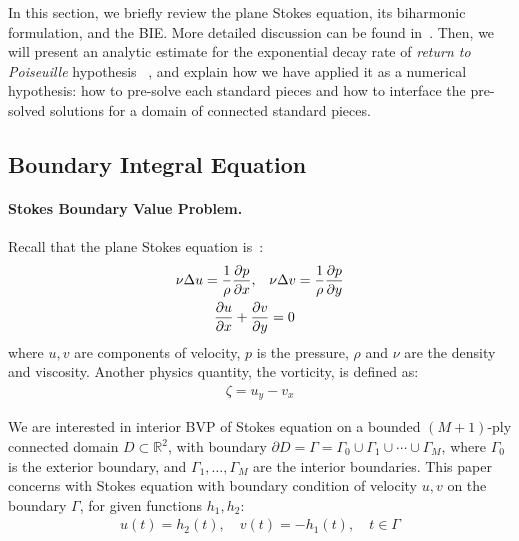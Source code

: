 \documentclass[10pt,twocolumn,letterpaper]{article}
\begin{document}
In this section, 
we briefly review the plane Stokes equation, its biharmonic formulation, and the BIE. 
More detailed discussion can be found in~\cite{greengardIntegralEquationMethods1996}. 
Then, we will present an analytic estimate for 
the exponential decay rate of \textit{return to Poiseuille} hypothesis
~\cite{gregoryTractionBoundaryValue1980}, 
and explain how we have applied it as a numerical hypothesis: how to pre-solve each
standard pieces and how to interface the pre-solved solutions for a domain of
connected standard pieces.

\subsection{Boundary Integral Equation}

\paragraph{Stokes Boundary Value Problem.}
Recall that the plane Stokes equation is~\cite{ladyzhenskayaMathematicalTheoryViscous1964}:
\begin{align}
  \nu \Delta u = \frac 1 \rho \pdv{p}{x},\quad & \nu \Delta v = \frac 1\rho \pdv{p}{y}
  \label{stokes}                                                                       \\
  \pdv{u}{x} + \pdv{v}{y}                      & = 0
  \label{continuity}
\end{align}
where $u,v$ are components of velocity, $p$ is the pressure,
$\rho$ and $\nu$ are the density and viscosity.
Another physics quantity, the vorticity, is defined as:
\begin{align}
\zeta  = u_y - v_x
\end{align}

We are interested in interior BVP of Stokes equation
on a bounded $(M+1)$-ply connected domain $D\subset \mathbb R^2$, 
with boundary $\partial D = \Gamma = \Gamma_0 \cup \Gamma_1 \cup \cdots \cup \Gamma_M$, 
where $\Gamma_0$ is the exterior boundary, 
and $\Gamma_1,\ldots, \Gamma_M$ are the interior boundaries. 
This paper concerns with Stokes equation with boundary condition of velocity $u,v$ on the boundary $\Gamma$,
for given functions $h_1,h_2$:
\begin{align}
  u(t) = h_2(t),\quad v(t) = - h_1(t), \quad t\in \Gamma
  \label{bdr-velocity}
\end{align}
\end{document}
